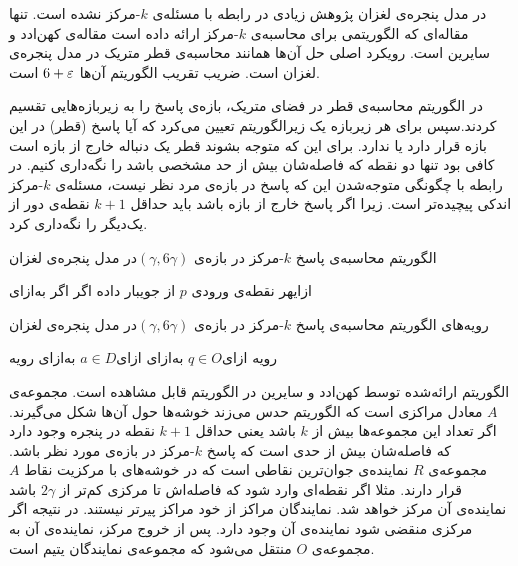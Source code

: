 در مدل پنجره‌ی لغزان پژوهش زیادی در رابطه با مسئله‌ی $k$-مرکز نشده است. تنها مقاله‌ای که الگوریتمی برای محاسبه‌ی $k$-مرکز ارائه داده است مقاله‌ی کهن‌ادد و سایرین  است. رویکرد اصلی حل آن‌ها همانند محاسبه‌ی قطر متریک در مدل پنجره‌ی لغزان است. ضریب تقریب الگوریتم آن‌ها $6+\varepsilon$ است.

در الگوریتم محاسبه‌ی قطر در فضای متریک، بازه‌ی پاسخ را به زیربازه‌هایی تقسیم کردند.سپس برای هر زیربازه یک زیرالگوریتم تعیین می‌کرد که آیا پاسخ (قطر) در این بازه قرار دارد یا ندارد. برای این که متوجه بشوند قطر یک دنباله خارج از بازه است کافی بود تنها دو نقطه که فاصله‌‌شان بیش از حد مشخصی باشد را نگه‌داری کنیم. در رابطه با چگونگی متوجه‌شدن این که پاسخ در بازه‌ی مرد نظر نیست، مسئله‌ی $k$-مرکز اندکی پیچیده‌تر است. زیرا اگر پاسخ خارج از بازه باشد باید حداقل $k+1$ نقطه‌ی دور از یک‌دیگر را نگه‌داری کرد. 

\caption
{الگوریتم محاسبه‌ی پاسخ $k$-مرکز در بازه‌ی $(\gamma, 6 \gamma) $در مدل پنجره‌ی لغزان }
‌ازای{هر نقطه‌ی ورودی $p$ از جویبار داده}
‌اگر{}
‌اگر{}
‌به‌ازای{}

\caption
{رویه‌های الگوریتم محاسبه‌ی پاسخ $k$-مرکز در بازه‌ی $(\gamma, 6 \gamma) $در مدل پنجره‌ی لغزان}

‌رویه{}
\EndIf{}
‌ازای{$q \in O$}
\EndIf{}
‌به‌ازای{}
\EndIf{}
\Else{}
‌ازای{$a \in D$}
‌به‌ازای{}
\EndIf{}
‌رویه{}



الگوریتم ارائه‌شده توسط کهن‌ادد و سایرین در الگوریتم  قابل مشاهده است. مجموعه‌ی $A$ معادل مراکزی است که الگوریتم حدس می‌زند خوشه‌ها حول آن‌ها شکل می‌گیرند. اگر تعداد این مجموعه‌ها بیش از $k$ باشد یعنی حداقل $k+1$ نقطه در پنجره وجود دارد که فاصله‌شان بیش از حدی است که پاسخ $k$-مرکز در بازه‌ی مورد نظر باشد. مجموعه‌ی $R$ نماینده‌ی جوان‌ترین نقاطی است که در خوشه‌های با مرکزیت نقاط $A$ قرار دارند. مثلا اگر نقطه‌ای وارد شود که فاصله‌اش تا مرکزی کم‌تر از $2 \gamma$ باشد نماینده‌ی آن مرکز خواهد شد. نمایندگان مراکز از خود مراکز پیرتر نیستند. در نتیجه اگر مرکزی منقضی شود نماینده‌ی آن وجود دارد. پس از خروج مرکز، نماینده‌ی آن به مجموعه‌ی $O$ منتقل می‌شود که مجموعه‌ی نمایندگان یتیم  است.
 
